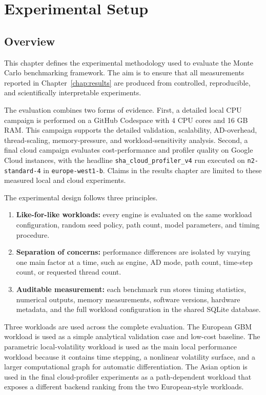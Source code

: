 \chapter{Experimental Setup}
\label{chap:experimental-setup}

\section{Overview}
\label{sec:exp-overview}

This chapter defines the experimental methodology used to evaluate the
Monte Carlo benchmarking framework.  The aim is to ensure that all
measurements reported in Chapter~\ref{chap:results} are produced from
controlled, reproducible, and scientifically interpretable experiments.

The evaluation combines two forms of evidence. First, a detailed local CPU
campaign is performed on a GitHub Codespace with 4 CPU cores and 16 GB RAM.
This campaign supports the detailed validation, scalability, AD-overhead,
thread-scaling, memory-pressure, and workload-sensitivity analysis. Second, a
final cloud campaign evaluates cost-performance and profiler quality on Google
Cloud instances, with the headline \texttt{sha\_cloud\_profiler\_v4} run
executed on \texttt{n2-standard-4} in \texttt{europe-west1-b}. Claims in the
results chapter are limited to these measured local and cloud experiments.

The experimental design follows three principles.

\begin{enumerate}
    \item \textbf{Like-for-like workloads:} every engine is evaluated on the
    same workload configuration, random seed policy, path count, model
    parameters, and timing procedure.

    \item \textbf{Separation of concerns:} performance differences are
    isolated by varying one main factor at a time, such as engine, AD mode,
    path count, time-step count, or requested thread count.

    \item \textbf{Auditable measurement:} each benchmark run stores timing
    statistics, numerical outputs, memory measurements, software versions,
    hardware metadata, and the full workload configuration in the shared
    SQLite database.
\end{enumerate}

Three workloads are used across the complete evaluation. The European GBM
workload is used as a simple analytical validation case and low-cost baseline.
The parametric local-volatility workload is used as the main local performance
workload because it contains time stepping, a nonlinear volatility surface, and
a larger computational graph for automatic differentiation. The Asian option is
used in the final cloud-profiler experiments as a path-dependent workload that
exposes a different backend ranking from the two European-style workloads.

